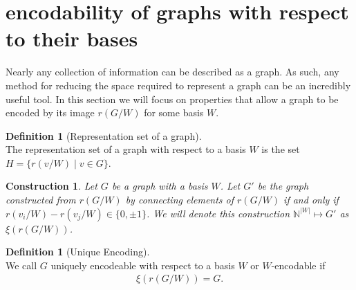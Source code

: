 \documentclass[11pt]{amsart}
\theoremstyle{plain}  %
\newtheorem{con}[thm]{Construction}
\theoremstyle{definition}
\newtheorem{defin}[thm]{{Definition}}
\theoremstyle{remark}
\numberwithin{equation}{thm}
\begin{document}
\section{encodability of graphs with respect to their bases}
Nearly any collection of information can be described as a graph. 
As such, any method for reducing the space required to represent a graph can be an incredibly useful tool.
In this section we will focus on properties that allow a graph to be encoded by its image $r(G/W)$ for some basis $W$.

  \begin{defin}[Representation set of a graph]\ \\
  The representation set of a graph with respect to a basis $W$ is the set $H=\{r(v/W)\mid v\in G\}$.   
  \end{defin}

  \begin{con}
   Let $G$ be a graph with a basis $W$. Let $G'$ be the graph constructed from $r(G/W)$ by connecting elements of $r(G/W)$ if and only if $r(v_i/W)-r(v_j/W) \in \{0, \pm 1\}$.
   We will denote this construction $\mathbb{N}^{|W|} \mapsto G'$ as $\xi (r(G/W))$.
  \end{con}

  
  \begin{defin}[Unique Encoding]\ \\
   We call $G$ uniquely encodeable with respect to a basis $W$ or $W$-encodable if
   \begin{align*}
    \xi (r(G/W)) = G.
   \end{align*}
  \end{defin}
\end{document}
